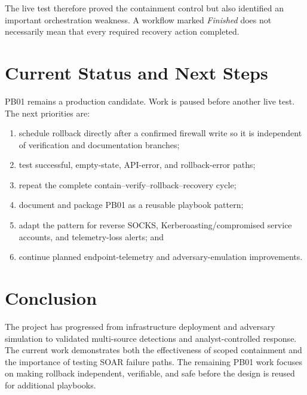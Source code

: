 \documentclass[11pt,a4paper]{article}
\begin{document}
The live test therefore proved the containment control but also identified an
important orchestration weakness. A workflow marked \textit{Finished} does not
necessarily mean that every required recovery action completed.

\section{Current Status and Next Steps}

PB01 remains a production candidate. Work is paused before another live test.
The next priorities are:

\begin{enumerate}[leftmargin=1.6em,itemsep=2pt]
  \item schedule rollback directly after a confirmed firewall write so it is
        independent of verification and documentation branches;
  \item test successful, empty-state, API-error, and rollback-error paths;
  \item repeat the complete contain--verify--rollback--recovery cycle;
  \item document and package PB01 as a reusable playbook pattern;
  \item adapt the pattern for reverse SOCKS, Kerberoasting/compromised service
        accounts, and telemetry-loss alerts; and
  \item continue planned endpoint-telemetry and adversary-emulation improvements.
\end{enumerate}

\section{Conclusion}

The project has progressed from infrastructure deployment and adversary
simulation to validated multi-source detections and analyst-controlled response.
The current work demonstrates both the effectiveness of scoped containment and
the importance of testing SOAR failure paths. The remaining PB01 work focuses
on making rollback independent, verifiable, and safe before the design is reused
for additional playbooks.
\end{document}
